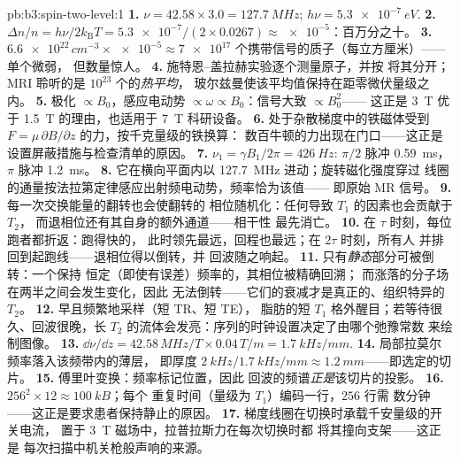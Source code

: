 \begin{solution}{pb:b3:spin-two-level:1}
\textbf{1.} $\nu = 42.58 \times 3.0 = \qty{127.7}{MHz}$; $h\nu =
\qty{5.3e-7}{eV}$.
\textbf{2.} $\Delta n/n = h\nu/2k_{\text{B}}T = \num{5.3e-7}/(2
\times 0.0267) \approx \num{e-5}$：百万分之十。
\textbf{3.} $\num{6.6e22}\,\unit{cm^{-3}} \times \num{e-5} \approx
\num{7e17}$ 个携带信号的质子（每立方厘米）——单个微弱，
但数量惊人。
\textbf{4.} 施特恩–盖拉赫实验逐个测量原子，并按
将其分开；MRI 聆听的是 $10^{23}$ 个的\emph{热平均}，
玻尔兹曼使该平均值保持在距零微伏量级之内。
\textbf{5.} 极化 $\propto B_0$，感应电动势
$\propto \omega \propto B_0$：信号大致 $\propto B_0^2$——
这正是 \qty{3}{T} 优于 \qty{1.5}{T} 的理由，也适用于
\qty{7}{T} 科研设备。
\textbf{6.} 处于杂散梯度中的铁磁体受到
$F = \mu\,\partial B/\partial z$ 的力，按千克量级的铁换算：
数百牛顿的力出现在门口——这正是
设置屏蔽措施与检查清单的原因。
\textbf{7.} $\nu_1 = \gamma B_1/2\pi = \qty{426}{Hz}$: $\pi/2$
脉冲 \qty{0.59}{ms}，$\pi$ 脉冲 \qty{1.2}{ms}。
\textbf{8.} 它在横向平面内以
\qty{127.7}{MHz} 进动；旋转磁化强度穿过
线圈的通量按法拉第定律感应出射频电动势，频率恰为该值——
即原始 MR 信号。
\textbf{9.} 每一次交换能量的翻转也会使翻转的
相位随机化：任何导致 $T_1$ 的因素也会贡献于 $T_2$，
而退相位还有其自身的额外通道——相干性
最先消亡。
\textbf{10.} 在 $\tau$ 时刻，每位跑者都折返：跑得快的，
此时领先最远，回程也最远；在 $2\tau$ 时刻，所有人
并排回到起跑线——退相位得以倒转，并
回波随之响起。
\textbf{11.} 只有\emph{静态}部分可被倒转：一个保持
恒定（即使有误差）频率的，其相位被精确回溯；
而涨落的分子场在两半之间会发生变化，因此
无法倒转——它们的衰减才是真正的、组织特异的 $T_2$。
\textbf{12.} 早且频繁地采样（短 TR、短 TE），
脂肪的短 $T_1$ 格外醒目；若等待很久、回波很晚，长 $T_2$
的流体会发亮：序列的时钟设置决定了由哪个弛豫常数
来绘制图像。
\textbf{13.} $\dd\nu/\dd z = 42.58\,\unit{MHz/T} \times
0.04\,\unit{T/m} = \qty{1.7}{kHz/mm}$.
\textbf{14.} 局部拉莫尔频率落入该频带内的薄层，
即厚度 $\qty{2}{kHz}/\qty{1.7}{kHz/mm} \approx
\qty{1.2}{mm}$——即选定的切片。
\textbf{15.} 傅里叶变换：频率标记位置，因此
回波的频谱\emph{正是}该切片的投影。
\textbf{16.} $256^2 \times 12 \approx \qty{100}{kB}$；每个
重复时间（量级为 $T_1$）编码一行，$256$ 行需
数分钟——这正是要求患者保持静止的原因。
\textbf{17.} 梯度线圈在切换时承载千安量级的开关电流，
置于 \qty{3}{T} 磁场中，拉普拉斯力在每次切换时都
将其撞向支架——这正是
每次扫描中机关枪般声响的来源。

\end{solution}
